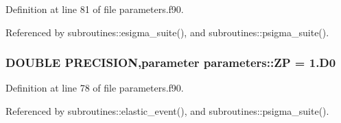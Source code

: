 Definition at line 81 of file parameters.f90.

Referenced by subroutines::esigma\_\-suite(), and subroutines::psigma\_\-suite().\hypertarget{namespaceparameters_af5f3e31c772340991fe768468c6a0dad}{
\subsubsection[{ZP}]{\setlength{\rightskip}{0pt plus 5cm}DOUBLE PRECISION,parameter {\bf parameters::ZP} = 1.D0}}
\label{namespaceparameters_af5f3e31c772340991fe768468c6a0dad}


Definition at line 78 of file parameters.f90.

Referenced by subroutines::elastic\_\-event(), and subroutines::psigma\_\-suite().
